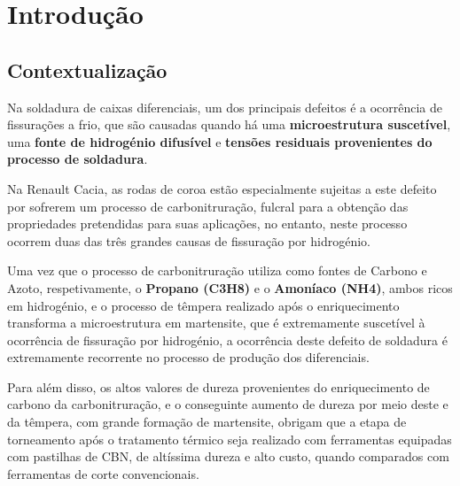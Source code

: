 \chapter{Introdução} \label{ch:intro}
\setlength{\headheight}{13.6pt}

\section{Contextualização} \label{s:intro_contextualizacao}

Na soldadura de caixas diferenciais, um dos principais defeitos é a ocorrência de fissurações a frio, que são causadas quando há uma \textbf{microestrutura suscetível}, uma \textbf{fonte de hidrogénio difusível} e \textbf{tensões residuais provenientes do processo de soldadura}.
\par
Na Renault Cacia, as rodas de coroa estão especialmente sujeitas a este defeito por sofrerem um processo de carbonitruração, fulcral para a obtenção das propriedades pretendidas para suas aplicações, no entanto, neste processo ocorrem duas das três grandes causas de fissuração por hidrogénio.
\par
Uma vez que o processo de carbonitruração utiliza como fontes de Carbono e Azoto, respetivamente, o \textbf{Propano (C3H8)} e o \textbf{Amoníaco (NH4)}, ambos ricos em hidrogénio, e o processo de têmpera realizado após o enriquecimento transforma a microestrutura em martensite, que é extremamente suscetível à ocorrência de fissuração por hidrogénio, a ocorrência deste defeito de soldadura é extremamente recorrente no processo de produção dos diferenciais.
\par
Para além disso, os altos valores de dureza provenientes do enriquecimento de carbono da carbonitruração, e o conseguinte aumento de dureza por meio deste e da têmpera, com grande formação de martensite, obrigam que a etapa de torneamento após o tratamento térmico seja realizado com ferramentas equipadas com pastilhas de CBN, de altíssima dureza e alto custo, quando comparados com ferramentas de corte convencionais.
